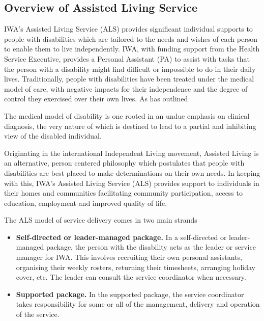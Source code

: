 \documentclass[a4paper,Times New Roman 11pt]{article}
\begin{document}
\begin{samepage}
\subsection {Overview of Assisted Living Service}
IWA's Assisted Living Service (ALS)  provides significant individual supports to people with disabilities which are tailored to the needs and wishes of each person to enable them to live independently. IWA, with funding support from the Health Service Executive, provides a Personal Assistant (PA) to assist with tasks that the person with a disability might find difficult or impossible to do in their daily lives. Traditionally, people with disabilities have been treated under the medical model of care, with negative impacts for their independence and the degree of control they exercised over their own lives. As \parencite{brisenden} has outlined
\begin{displayquote}
The medical model of disability is one rooted in an undue emphasis on clinical diagnosis, the very nature of which is destined to lead to a partial and inhibiting view of the disabled individual. 
\end{displayquote} 
\newpage
Originating in the international Independent Living movement, Assisted Living is an alternative, person centered philosophy which postulates that people with disabilities are best placed to make determinations on their own needs. In keeping with this, IWA's Assisted Living Service (ALS) provides support to individuals in their homes and communities facilitating community participation, access to education, employment and improved quality of life. 

The ALS model of service delivery comes in two main strands
\begin{itemize}
\item  \textbf {Self-directed or leader-managed package. }In a self-directed or leader-managed package, the person with the disability acts as the leader or service manager for IWA. This involves recruiting their own personal assistants, organising their weekly rosters, returning their timesheets, arranging holiday cover, etc. The leader can consult the service coordinator when necessary.
\item \textbf {Supported package.} In the supported package, the service coordinator takes responsibility for some or all of the management, delivery and operation of the service.
\end{itemize} 


\end{samepage}
\end{document}
